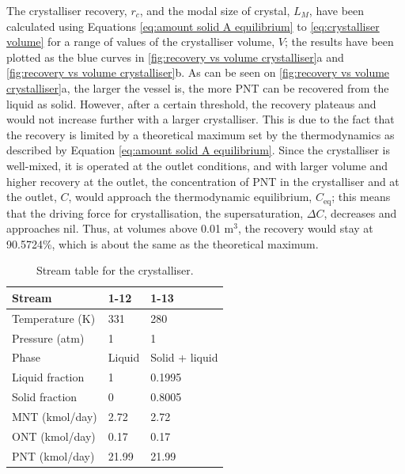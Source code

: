 \noindent The crystalliser recovery, $r_c$, and the modal size of crystal, $L_M$, have been calculated using Equations \ref{eq:amount solid A equilibrium} to \ref{eq:crystalliser volume} for a range of values of the crystalliser volume, $V$; the results have been plotted as the blue curves in \cref{fig:recovery vs volume crystalliser}a and \cref{fig:recovery vs volume crystalliser}b. As can be seen on \cref{fig:recovery vs volume crystalliser}a, the larger the vessel is, the more PNT can be recovered from the liquid as solid. However, after a certain threshold, the recovery plateaus and would not increase further with a larger crystalliser. This is due to the fact that the recovery is limited by a theoretical maximum set by the thermodynamics as described by Equation \ref{eq:amount solid A equilibrium}. Since the crystalliser is well-mixed, it is operated at the outlet conditions, and with larger volume and higher recovery at the outlet, the concentration of PNT in the crystalliser and at the outlet, $C$, would approach the thermodynamic equilibrium, $C_{\mathrm{eq}}$; this means that the driving force for crystallisation, the supersaturation, $\Delta C$, decreases and approaches nil. Thus, at volumes above 0.01 m$^{3}$, the recovery would stay at 90.5724\%, which is about the same as the theoretical maximum.

\begin{table}
\centering
\caption{Stream table for the crystalliser.}
\label{tab:crystalliser stream table}
\begin{tabular}{@{}l|l|l@{}}
\toprule
Stream                  &    1-12  &  1-13 \\ \midrule
Temperature (K)   &    331      & 280 \\ \midrule
Pressure (atm)   &      1    &  1 \\ \midrule
Phase               &   Liquid    & Solid + liquid \\ \midrule
Liquid fraction       &   1       & 0.1995 \\ \midrule
Solid fraction         &  0        & 0.8005 \\ \midrule
MNT (kmol/day)          &  2.72        & 2.72 \\ \midrule
ONT (kmol/day)        &    0.17      & 0.17 \\ \midrule
PNT (kmol/day)          &    21.99      & 21.99 \\ \bottomrule
\end{tabular}
\end{table}

